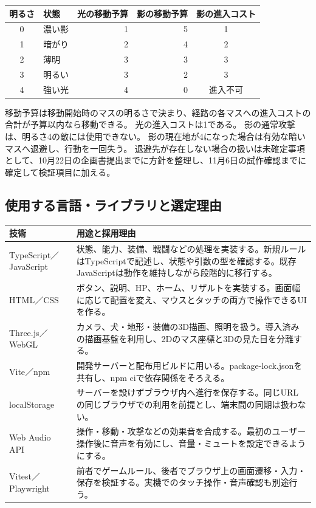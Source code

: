 \documentclass[a4paper,11pt,dvipdfmx]{jsarticle}
\begin{document}
\begin{center}
\small
\begin{tabular}{@{}clrrc@{}}
\toprule
明るさ & 状態 & 光の移動予算 & 影の移動予算 & 影の進入コスト\\
\midrule
0 & 濃い影 & 1 & 5 & 1\\
1 & 暗がり & 2 & 4 & 2\\
2 & 薄明 & 3 & 3 & 3\\
3 & 明るい & 3 & 2 & 3\\
4 & 強い光 & 4 & 0 & 進入不可\\
\bottomrule
\end{tabular}
\end{center}

移動予算は移動開始時のマスの明るさで決まり、経路の各マスへの進入コストの合計が予算以内なら移動できる。
光の進入コストは1である。
影の通常攻撃は、明るさ4の敵には使用できない。
影の現在地が4になった場合は有効な暗いマスへ退避し、行動を一回失う。
退避先が存在しない場合の扱いは未確定事項として、10月22日の企画書提出までに方針を整理し、11月6日の試作確認までに確定して検証項目に加える。

\subsection{使用する言語・ライブラリと選定理由}
\begin{tabularx}{\linewidth}{@{}p{31mm}Y@{}}
\toprule
技術 & 用途と採用理由 \\
\midrule
TypeScript／JavaScript & 状態、能力、装備、戦闘などの処理を実装する。新規ルールはTypeScriptで記述し、状態や引数の型を確認する。既存JavaScriptは動作を維持しながら段階的に移行する。\\
HTML／CSS & ボタン、説明、HP、ホーム、リザルトを実装する。画面幅に応じて配置を変え、マウスとタッチの両方で操作できるUIを作る。\\
Three.js／WebGL & カメラ、犬・地形・装備の3D描画、照明を扱う。導入済みの描画基盤を利用し、2Dのマス座標と3Dの見た目を分離する。\\
Vite／npm & 開発サーバーと配布用ビルドに用いる。package-lock.jsonを共有し、npm ciで依存関係をそろえる。\\
localStorage & サーバーを設けずブラウザ内へ進行を保存する。同じURLの同じブラウザでの利用を前提とし、端末間の同期は扱わない。\\
Web Audio API & 操作・移動・攻撃などの効果音を合成する。最初のユーザー操作後に音声を有効にし、音量・ミュートを設定できるようにする。\\
Vitest／Playwright & 前者でゲームルール、後者でブラウザ上の画面遷移・入力・保存を検証する。実機でのタッチ操作・音声確認も別途行う。\\
\bottomrule
\end{tabularx}
\end{document}
